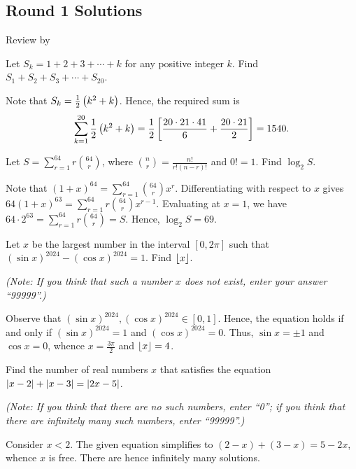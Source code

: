 \subsection{Round 1 Solutions}\label{S::2024-O-1}

\begin{resources}
    Review by 
\end{resources}

\begin{question}[1540]\label{A::2024-O-1-1}
    Let $S_k = 1 + 2 + 3 + \cdots + k$ for any positive integer $k$. Find $S_1 + S_2 + S_3 + \cdots + S_{20}$.
\end{question}
\begin{solution*}
    Note that $S_k = \frac12 \left( k^2 + k \right)$. Hence, the required sum is \[\sum_{k= 1}^{20} \frac12 \left( k^2 + k \right) = \frac12 \left[ \frac{20 \cdot 21 \cdot 41}{6} + \frac{20 \cdot 21}{2} \right] = 1540.\]
\end{solution*}

\begin{question}[69]\label{A::2024-O-1-2}
    Let $S = \sum_{r=1}^{64} r\binom{64}{r}$, where $\binom{n}{r} = \frac{n!}{r! (n-r)!}$ and $0! = 1$. Find $\log_2 S$.
\end{question}
\begin{solution*}
    Note that $(1 + x)^{64} = \sum_{r = 1}^{64} \binom{64}{r} x^{r}$. Differentiating with respect to $x$ gives $64 (1 + x)^{63} = \sum_{r = 1}^{64} r\binom{64}{r} x^{r-1}$. Evaluating at $x = 1$, we have $64 \cdot 2^{63} = \sum_{r = 1}^{64} r \binom{64}{r} = S$. Hence, $\log_2 S = 69$.
\end{solution*}

\begin{question}[4]\label{A::2024-O-1-3}
    Let $x$ be the largest number in the interval $[0, 2\pi]$ such that $(\sin x)^{2024} - (\cos x)^{2024} = 1$. Find $\left\lfloor x \right\rfloor$.

    \noindent\textit{(Note: If you think that such a number $x$ does not exist, enter your answer ``99999''.)}
\end{question}
\begin{solution*}
    Observe that $(\sin x)^{2024}, (\cos x)^{2024} \in [0, 1]$. Hence, the equation holds if and only if $(\sin x)^{2024} = 1$ and $(\cos x)^{2024} = 0$. Thus, $\sin x = \pm 1$ and $\cos x = 0$, whence $x = \frac{3\pi}{2}$ and $\left\lfloor x \right\rfloor = 4$.
\end{solution*}

\begin{question}[99999]\label{A::2024-O-1-4}
    Find the number of real numbers $x$ that satisfies the equation $\left\lvert x - 2 \right\rvert + \left\lvert x - 3 \right\rvert = \left\lvert 2x - 5 \right\rvert$.

    \noindent\textit{(Note: If you think that there are no such numbers, enter ``0''; if you think that there are infinitely many such numbers, enter ``99999''.)}
\end{question}
\begin{solution*}
    Consider $x < 2$. The given equation simplifies to $(2-x) + (3-x) = 5 - 2x$, whence $x$ is free. There are hence infinitely many solutions.
\end{solution*}


